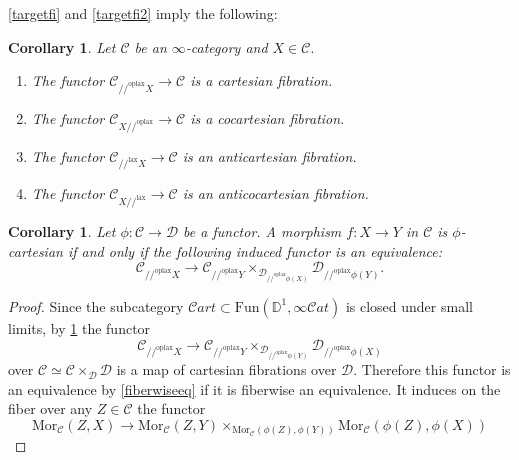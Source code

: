 \documentclass[10pt,oneside]{article}
\numberwithin{equation}{section} %
\numberwithin{figure}{section} %
\theoremstyle{plain}
\newtheorem{corollary}[theorem]{Corollary}
\theoremstyle{definition}
\newcommand{\bD}{{\mathbb D}}
\newcommand{\mC}{{\mathcal C}}
\newcommand{\mD}{{\mathcal D}}
\newcommand{\Fun}{\mathrm{Fun}}
\newcommand{\lax}{{\mathrm{lax}}}
\newcommand{\oplax}{{\mathrm{oplax}}}
\newcommand{\Mor}{{\mathrm{Mor}}}
\newcommand{\scat}{\mathcal{C}\mathit{at}}
\begin{document}
\cref{targetfi} and \cref{targetfi2} imply the following:

\begin{corollary}\label{slicecocart}
Let $\mC$ be an $\infty$-category and $X \in \mC.$



\begin{enumerate}[\normalfont(1)]\setlength{\itemsep}{-2pt}
\item The functor $ \mC_{//^\oplax X}\to \mC$ is a cartesian fibration. 

\item The functor $ \mC_{X //^\oplax}\to \mC$ is a cocartesian fibration.

\item The functor $ \mC_{//^\lax X}\to \mC$ is an anticartesian fibration. 

\item The functor $ \mC_{X //^\lax}\to \mC$ is an anticocartesian fibration.

\end{enumerate}
\end{corollary}




\begin{corollary}
Let $\phi: \mC \to \mD$ be a functor. A morphism $f: X \to Y$ in $\mC$ is
$\phi$-cartesian if and only if the following induced functor is an equivalence:
$$ \mC_{//^\oplax X}\to \mC_{//^\oplax Y} \times_{\mD_{// ^\oplax \phi(X)}} \mD_{//^\oplax \phi(Y)}. $$
\end{corollary}

\begin{proof}

Since the subcategory $\mathcal{C}\mathit{art} \subset \Fun(\bD^1,\infty\scat)$ is closed under small limits, by \cref{slicecocart} the functor $$ \mC_{//^\oplax X}\to \mC_{// ^\oplax Y} \times_{\mD_{// ^\oplax \phi(Y)}} \mD_{//  ^\oplax \phi(X)} $$ over
$ \mC \simeq \mC \times_\mD \mD$ is a map of cartesian fibrations over
$\mD$. Therefore this functor is an equivalence by \ref{fiberwiseeq} if it is fiberwise an equivalence. It induces on the fiber over any $Z \in \mC$
the functor $$ \Mor_\mC(Z,X)\to \Mor_\mC(Z,Y) \times_{\Mor_\mC(\phi(Z),\phi(Y))} \Mor_\mC(\phi(Z),\phi(X)) $$
\end{proof}
\end{document}
